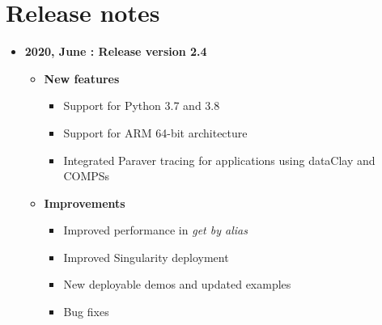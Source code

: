 \chapter*{Release notes}

\begin{itemize}
\item[] \textbf{2020, June : Release version 2.4}\newline
    \begin{itemize}
    \item[] \textbf{New features}
        \begin{itemize}
            \item[] Support for Python 3.7 and 3.8
            \item[] Support for ARM 64-bit architecture
            \item[] Integrated Paraver tracing for applications using dataClay and COMPSs
        \end{itemize}
    \item[] \textbf{Improvements}
        \begin{itemize}
            \item[] Improved performance in \textit{get by alias}
            \item[] Improved Singularity deployment
            \item[] New deployable demos and updated examples
            \item[] Bug fixes
        \end{itemize}
    \end{itemize}
\end{itemize}
